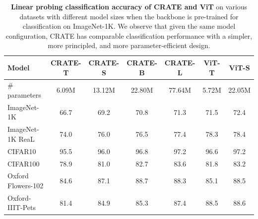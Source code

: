 \documentclass[../../book-main.tex]{subfiles}
\begin{document}
\begin{table}
    \centering
    \begin{tabular}{@{}lcccc|cc@{}}
    \toprule
    \textbf{Model} & CRATE-T  &  CRATE-S & CRATE-B & CRATE-L & { \color{gray} ViT-T} &  { \color{gray}ViT-S } \\ 
    \midrule
    \midrule
     \# parameters & 6.09M & 13.12M & 22.80M & 77.64M & { \color{gray} 5.72M} & { \color{gray} 22.05M} \\
    \midrule
     ImageNet-1K & 66.7 & 69.2 & 70.8 & 71.3 & { \color{gray} 71.5} & { \color{gray} 72.4} \\
     ImageNet-1K ReaL & 74.0 & 76.0 & 76.5 & 77.4 & { \color{gray} 78.3 } & { \color{gray} 78.4} \\
     CIFAR10 & 95.5 & 96.0 & 96.8 & 97.2 & { \color{gray} 96.6} & { \color{gray} 97.2} \\
     CIFAR100 & 78.9 & 81.0 & 82.7 & 83.6 & { \color{gray} 81.8} & { \color{gray} 83.2}\\
     Oxford Flowers-102 & 84.6 & 87.1 & 88.7 & 88.3 & { \color{gray} 85.1} & { \color{gray} 88.5}\\
     Oxford-IIIT-Pets & 81.4 & 84.9 & 85.3 & 87.4 & { \color{gray} 88.5} & { \color{gray} 88.6} \\
     \bottomrule
    \end{tabular}
    \caption{\small \textbf{Linear probing classification accuracy of CRATE and ViT} on various datasets with different model sizes when the backbone is pre-trained for classification on ImageNet-1K. We observe that given the same model configuration, CRATE has comparable classification performance with a simpler, more principled, and more parameter-efficient design.}
    \label{tab:crate_classification_linear_probing}
\end{table}
\end{document}
